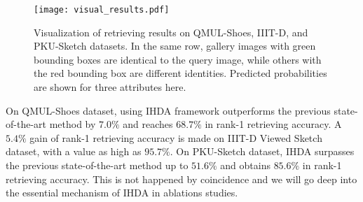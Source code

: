 \documentclass[journal]{IEEEtran}
\begin{document}
\tabcolsep=4pt
\begin{table}[!ht]
\centering
\caption{The performance of sketch-to-photo retrieval on the PKU-Sketch dataset.}
\label{t:results_PKU-Sketch}
\end{table}

\begin{figure}[!htb]
\centering
  \texttt{[image: visual\_results.pdf]}
  \caption{Visualization of retrieving results on QMUL-Shoes, IIIT-D, and PKU-Sketch datasets. In the same row, gallery images with green bounding boxes are identical to the query image, while others with the red bounding box are different identities. Predicted probabilities are shown for three attributes here.}
  \label{fig:visual}
\end{figure}

On QMUL-Shoes dataset, using IHDA framework outperforms the previous state-of-the-art method by $7.0\%$ and reaches $68.7\%$ in rank-1 retrieving accuracy. A $5.4\%$ gain of rank-1 retrieving accuracy is made on IIIT-D Viewed Sketch dataset, with a value as high as $95.7\%$. On PKU-Sketch dataset, IHDA surpasses the previous state-of-the-art method up to $51.6\%$ and obtains $85.6\%$ in rank-1 retrieving accuracy. This is not happened by coincidence and we will go deep into the essential mechanism of IHDA in ablations studies.
\end{document}
